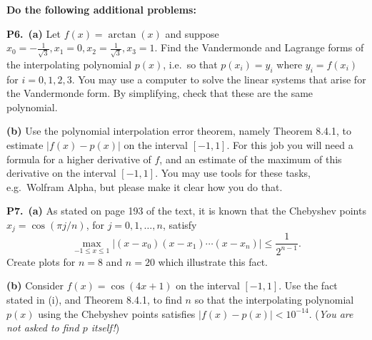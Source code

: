\documentclass[12pt]{amsart}
\newcommand{\prob}[1]{\bigskip\noindent\textbf{#1.}\quad }
\newcommand{\epart}[1]{\medskip\noindent\textbf{(#1)}\quad }
\newcommand{\ppart}[1]{\,\textbf{(#1)}\quad }
\begin{document}
\bigskip
\noindent \textbf{Do the following additional problems:}

\prob{P6}  \ppart{a}  Let $f(x)=\arctan(x)$ and suppose $x_0=-\frac{1}{\sqrt{3}},x_1=0,x_2=\frac{1}{\sqrt{3}},x_3=1$.  Find the Vandermonde and Lagrange forms of the interpolating polynomial $p(x)$, i.e.~so that $p(x_i)=y_i$ where $y_i=f(x_i)$ for $i=0,1,2,3$.  You may use a computer to solve the linear systems that arise for the Vandermonde form.  By simplifying, check that these are the same polynomial.

\epart{b}  Use the polynomial interpolation error theorem, namely Theorem 8.4.1, to estimate $|f(x)-p(x)|$ on the interval $[-1,1]$.  For this job you will need a formula for a higher derivative of $f$, and an estimate of the maximum of this derivative on the interval $[-1,1]$.  You may use tools for these tasks, e.g.~Wolfram Alpha, but please make it clear how you do that.

\prob{P7}  \ppart{a}  As stated on page 193 of the text, it is known that the Chebyshev points $x_j=\cos(\pi j/n)$, for $j=0,1,\dots,n$, satisfy
        $$\max_{-1\le x\le 1} \left|(x-x_0)(x-x_1)\cdots(x-x_n)\right| \le \frac{1}{2^{n-1}}.$$
    Create plots for $n=8$ and $n=20$ which illustrate this fact.
    
\epart{b}  Consider $f(x) = \cos(4x+1)$ on the interval $[-1,1]$.  Use the fact stated in (i), and Theorem 8.4.1, to find $n$ so that the interpolating polynomial $p(x)$ using the Chebyshev points satisfies $|f(x)-p(x)|<10^{-14}$.  (\emph{You are \emph{not} asked to find $p$ itself!})
\end{document}
